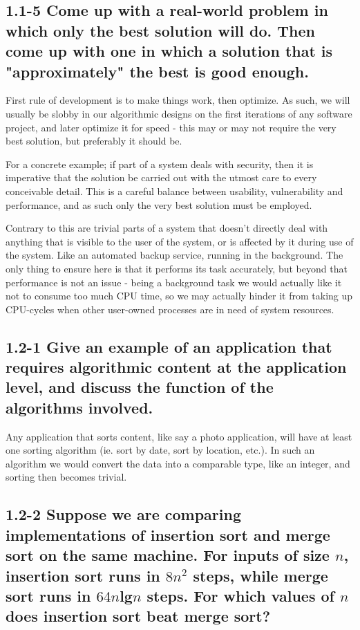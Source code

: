 \documentclass[11pt,english]{article}
\begin{document}
\subsection*{1.1-5 \mdseries Come up with a real-world problem in which only
the best solution will do. Then come up with one in which a solution that is
"approximately" the best is good enough.}
First rule of development is to make things work, then optimize. As such, we
will usually be slobby in our algorithmic designs on the first iterations of
any software project, and later optimize it for speed - this may or may not
require the very best solution, but preferably it should be.

For a concrete example; if part of a system deals with security, then it is
imperative that the solution be carried out with the utmost care to every
conceivable detail. This is a careful balance between usability, vulnerability
and performance, and as such only the very best solution must be employed.

Contrary to this are trivial parts of a system that doesn't directly deal with
anything that is visible to the user of the system, or is affected by it
during use of the system. Like an automated backup service, running in the
background. The only thing to ensure here is that it performs its task
accurately, but beyond that performance is not an issue - being a background
task we would actually like it not to consume too much CPU time, so we may
actually hinder it from taking up CPU-cycles when other user-owned processes
are in need of system resources.

\subsection*{1.2-1 \mdseries Give an example of an application that requires
algorithmic content at the application level, and discuss the function of the
algorithms involved.}
Any application that sorts content, like say a photo application, will have
at least one sorting algorithm (ie. sort by date, sort by location, etc.).
In such an algorithm we would convert the data into a comparable type, like
an integer, and sorting then becomes trivial.

\subsection*{1.2-2 \mdseries Suppose we are comparing implementations of
insertion sort and merge sort on the same machine. For inputs of size $n$,
insertion sort runs in $8n^2$ steps, while merge sort runs in $64n$lg$n$
steps. For which values of $n$ does insertion sort beat merge sort?}
\end{document}
